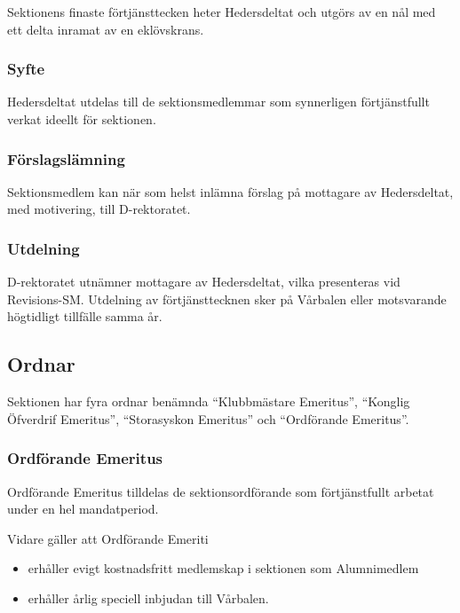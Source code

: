 \documentclass{dgovdoc}
\begin{document}
Sektionens finaste förtjänsttecken heter Hedersdeltat och utgörs av en nål med
ett delta inramat av en eklövskrans.

\subsubsection{Syfte}

Hedersdeltat utdelas till de sektionsmedlemmar som synnerligen förtjänstfullt
verkat ideellt för sektionen.

\subsubsection{Förslagslämning}

Sektionsmedlem kan när som helst inlämna förslag på mottagare av Hedersdeltat,
med motivering, till D-rektoratet.

\subsubsection{Utdelning}

D-rektoratet utnämner mottagare av Hedersdeltat, vilka presenteras vid
Revisions-SM. Utdelning av förtjänsttecknen sker på Vårbalen eller motsvarande
högtidligt tillfälle samma år.

\subsection{Ordnar}

Sektionen har fyra ordnar benämnda ``Klubbmästare Emeritus'', ``Konglig
Öfverdrif Emeritus'', ``Storasyskon Emeritus'' och ``Ordförande Emeritus''.

\subsubsection{Ordförande Emeritus}

Ordförande Emeritus tilldelas de sektionsordförande som förtjänstfullt arbetat
under en hel mandatperiod.

Vidare gäller att Ordförande Emeriti

\begin{itemize}
  \item erhåller evigt kostnadsfritt medlemskap i sektionen som Alumnimedlem
  \item erhåller årlig speciell inbjudan till Vårbalen.
\end{itemize}
\end{document}
